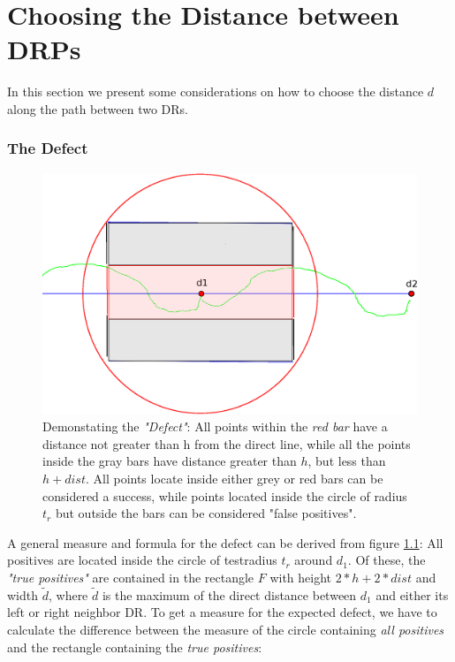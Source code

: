 \chapter{Choosing the Distance between DRPs}
\label{choosingDistance}
In this section we present some considerations on how to choose the 
distance $d$ along the path between two DRs.

\subsection{The Defect} 

\begin{figure}

\includegraphics[scale=0.5]{images/04.01.defect.eps}
\caption{Demonstating the \emph{"Defect"}: All points within the \emph{red bar} have 		
         a distance not greater than h from the direct line, while all the points
	inside the gray bars have distance greater than $h$, but less than $h+dist$.
	All points locate inside either grey or red bars can be considered a success,
	while points located inside the circle of radius $t_r$ but outside the 
	bars can be considered  "false positives".
	}
\label{generalDefectFigure}
\end{figure}

A general measure and formula for the defect can be derived from figure \ref{generalDefectFigure}:
All positives are located inside the circle of testradius $t_r$ around $d_1$.
Of these, the \emph{"true positives"} are contained in the rectangle $F$ with height $2*h+2*dist$
and width $\tilde{d}$, where $\tilde{d}$ is the maximum of the direct distance between 
$d_1$ and either its left or right neighbor DR. 
To get a measure for the expected defect, we have to calculate the difference between 
the measure of the circle containing \emph{all positives} and the rectangle containing the \emph{true positives}:

